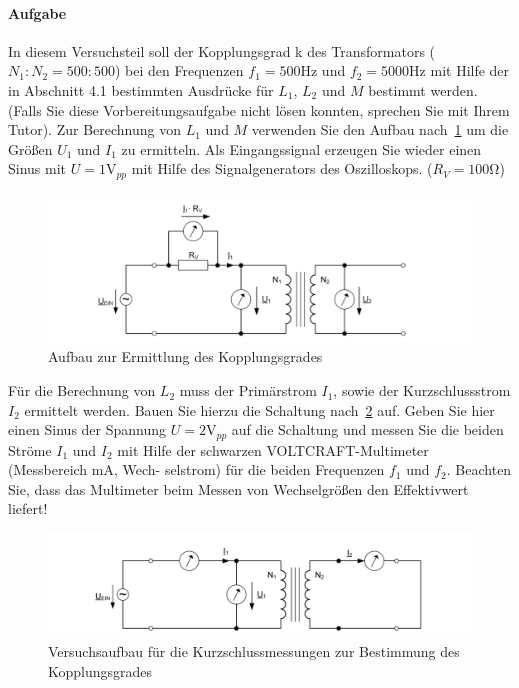 \documentclass[10pt]{scrreprt}
\begin{document}
        \paragraph{Aufgabe}
        In diesem Versuchsteil soll der Kopplungsgrad k des Transformators ($N_1 : N_2 = 500 : 500$)
        bei den Frequenzen $f_1 = 500\si{\hertz}$ und $f_2 = 5000\si{\hertz}$ mit Hilfe der in Abschnitt 4.1
        bestimmten Ausdrücke für $L_1$, $L_2$ und $M$ bestimmt werden. (Falls Sie diese Vorbereitungsaufgabe
        nicht lösen konnten, sprechen Sie mit Ihrem Tutor). Zur Berechnung von $L_1$ und $M$
        verwenden Sie den Aufbau nach~\ref{fig:abb10} um die Größen $U_1$ und $I_1$ zu ermitteln. Als
        Eingangssignal erzeugen Sie wieder einen Sinus mit $U = 1\si{\volt}_{pp}$ mit Hilfe des
        Signalgenerators des Oszilloskops. ($R_V = 100\si{\ohm}$)

        \begin{center}
            \begin{figure}[H]
                \includegraphics[width=\textwidth]{aufgabenBilder/abbildung10.png}
                \caption{Aufbau zur Ermittlung des Kopplungsgrades}
                \label{fig:abb10}
            \end{figure}
        \end{center}

        Für die Berechnung von $L_2$ muss der Primärstrom $I_1$, sowie der Kurzschlussstrom $I_2$
        ermittelt werden. Bauen Sie hierzu die Schaltung nach~\ref{fig:abb11} auf. Geben Sie hier
        einen Sinus der Spannung $U = 2\si{\volt}_{pp}$ auf die Schaltung und messen Sie die beiden Ströme
        $I_1$ und $I_2$ mit Hilfe der schwarzen VOLTCRAFT-Multimeter (Messbereich mA, Wech-
        selstrom) für die beiden Frequenzen $f_1$ und $f_2$. Beachten Sie, dass das Multimeter beim
        Messen von Wechselgrößen den Effektivwert liefert!

        \begin{center}
            \begin{figure}[H]
                \includegraphics[width=\textwidth]{aufgabenBilder/abbildung11.png}
                \caption{Versuchsaufbau für die Kurzschlussmessungen zur Bestimmung des Kopplungsgrades}
                \label{fig:abb11}
            \end{figure}
        \end{center}
\end{document}
